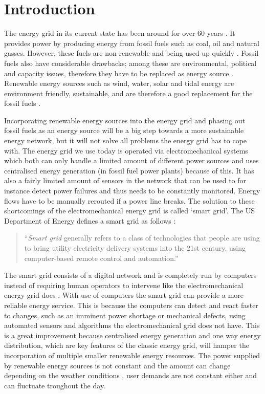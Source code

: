 \section{Introduction}\label{intro}
\acresetall
The energy grid in its current state has been around for over 60 years \cite{Wang2011}. It provides power by producing energy from fossil fuels such as coal, oil and natural gasses. However, these fuels are non-renewable and being used up quickly \cite{Wang2011}. Fossil fuels also have considerable drawbacks; among these are environmental, political and capacity issues, therefore they have to be replaced as energy source \cite{friedman2008hot}. Renewable energy sources such as wind, water, solar and tidal energy are environment friendly, sustainable, and are therefore a good replacement for the fossil fuels \cite{Tromly2001}.

Incorporating renewable energy sources into the energy grid and phasing out fossil fuels as an energy source will be a big step towards a more sustainable energy network, but it will not solve all problems the energy grid has to cope with. The energy grid we use today is operated via electromechanical systems which both can only handle a limited amount of different power sources and uses centralised energy generation (in fossil fuel power plants) because of this. It has also a fairly limited amount of sensors in the network that can be used to for instance detect power failures and thus needs to be constantly monitored. Energy flows have to be manually rerouted if a power line breaks. The solution to these shortcomings of the electromechanical energy grid is called `smart grid'. The US Department of Energy defines a smart grid as follows \cite{doe}: 
 
\begin{quote}
``\emph{Smart grid} generally refers to a class of technologies that people are using to bring utility electricity delivery systems into the 21st century, using computer-based remote control and automation.''
\end{quote}

The smart grid consists of a digital network and is completely run by computers instead of requiring human operators to intervene like the electromechanical energy grid does \cite{Moslehi2010}. With use of computers the smart grid can provide a more reliable energy service. This is because the computers can detect and react faster to changes, such as an imminent power shortage or mechanical defects, using automated sensors and algorithms the electromechanical grid does not have. This is a great improvement because centralised energy generation and one way energy distribution, which are key features of the classic energy grid, will hamper the incorporation of multiple smaller renewable energy resources. The power supplied by renewable energy sources is not constant and the amount can change depending on the weather conditions \cite{RamchurnVitelingumRogersJennings2014}, user demands are not constant either and can fluctuate troughout the day.

